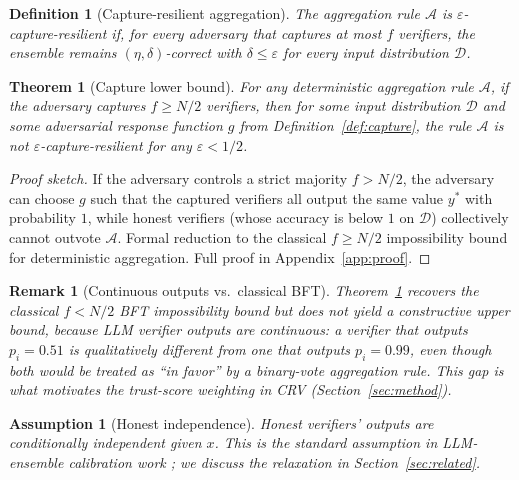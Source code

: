 \documentclass[11pt]{article}
\newtheorem{definition}{Definition}
\newtheorem{theorem}{Theorem}
\newtheorem{remark}{Remark}
\newtheorem{assumption}{Assumption}
\newcommand{\A}{\mathcal{A}}            %
\begin{document}
\begin{definition}[Capture-resilient aggregation]
\label{def:resilient}
The aggregation rule $\mathcal{A}$ is $\varepsilon$-\emph{capture-resilient}
if, for every adversary that captures at most $f$ verifiers, the ensemble
remains $(\eta, \delta)$-correct with $\delta \leq \varepsilon$ for every
input distribution $\mathcal{D}$.
\end{definition}

\begin{theorem}[Capture lower bound]
\label{thm:lower}
For any deterministic aggregation rule $\mathcal{A}$, if the adversary
captures $f \geq N/2$ verifiers, then for \emph{some} input distribution
$\mathcal{D}$ and \emph{some} adversarial response function $g$ from
Definition~\ref{def:capture}, the rule $\mathcal{A}$ is not
$\varepsilon$-capture-resilient for any $\varepsilon < 1/2$.
\end{theorem}

\begin{proof}[Proof sketch]
If the adversary controls a strict majority $f > N/2$, the adversary can
choose $g$ such that the captured verifiers all output the same value $y^*$
with probability $1$, while honest verifiers (whose accuracy is below $1$
on $\mathcal{D}$) collectively cannot outvote $\A$. Formal reduction to
the classical $f \geq N/2$ impossibility bound for deterministic
aggregation. Full proof in Appendix~\ref{app:proof}.
\end{proof}

\begin{remark}[Continuous outputs vs.\ classical BFT]
Theorem~\ref{thm:lower} recovers the classical $f < N/2$ BFT impossibility
bound but does not yield a constructive upper bound, because LLM verifier
outputs are continuous: a verifier that outputs $p_i = 0.51$ is
qualitatively different from one that outputs $p_i = 0.99$, even though
both would be treated as ``in favor'' by a binary-vote aggregation rule.
This gap is what motivates the trust-score weighting in \textsc{CRV}
(Section~\ref{sec:method}).
\end{remark}

\begin{assumption}[Honest independence]
\label{ass:indep}
Honest verifiers' outputs are conditionally independent given $x$. This
is the standard assumption in LLM-ensemble calibration work
\citep{cui2026edo,zheng2023judging}; we discuss the relaxation in
Section~\ref{sec:related}.
\end{assumption}
\end{document}
